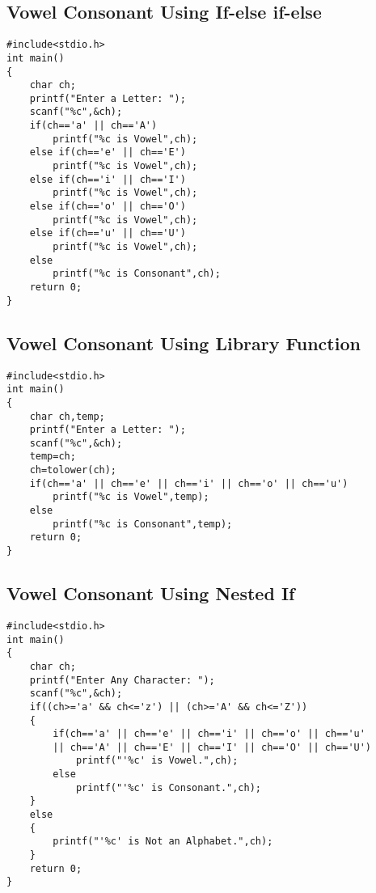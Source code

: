 \documentclass[a4paper,14pt]{article}
\begin{document}
\subsection{Vowel Consonant Using If-else if-else}
\vspace{0.5cm}
\begin{lstlisting}[caption={Vowel Consonant Using If-else if-else}]
#include<stdio.h>
int main()
{
    char ch;
    printf("Enter a Letter: ");
    scanf("%c",&ch);
    if(ch=='a' || ch=='A')
        printf("%c is Vowel",ch);
    else if(ch=='e' || ch=='E')
        printf("%c is Vowel",ch);
    else if(ch=='i' || ch=='I')
        printf("%c is Vowel",ch);
    else if(ch=='o' || ch=='O')
        printf("%c is Vowel",ch);
    else if(ch=='u' || ch=='U')
        printf("%c is Vowel",ch);
    else
        printf("%c is Consonant",ch);
    return 0;
}
\end{lstlisting}
\newpage

\subsection{Vowel Consonant Using Library Function}
\vspace{0.5cm}
\begin{lstlisting}[caption={Vowel Consonant Using Library Function}]
#include<stdio.h>
int main()
{
    char ch,temp;
    printf("Enter a Letter: ");
    scanf("%c",&ch);
    temp=ch;
    ch=tolower(ch);
    if(ch=='a' || ch=='e' || ch=='i' || ch=='o' || ch=='u')
        printf("%c is Vowel",temp);
    else
        printf("%c is Consonant",temp);
    return 0;
}
\end{lstlisting}
\newpage

\subsection{Vowel Consonant Using Nested If}
\vspace{0.5cm}
\begin{lstlisting}[caption={Vowel Consonant Using Nested If}]
#include<stdio.h>
int main()
{
    char ch;
    printf("Enter Any Character: ");
    scanf("%c",&ch);
    if((ch>='a' && ch<='z') || (ch>='A' && ch<='Z'))
    {
        if(ch=='a' || ch=='e' || ch=='i' || ch=='o' || ch=='u' 
        || ch=='A' || ch=='E' || ch=='I' || ch=='O' || ch=='U')
            printf("'%c' is Vowel.",ch);
        else
            printf("'%c' is Consonant.",ch);
    }
    else
    {
        printf("'%c' is Not an Alphabet.",ch);
    }
    return 0;
}
\end{lstlisting}
\newpage
\end{document}
